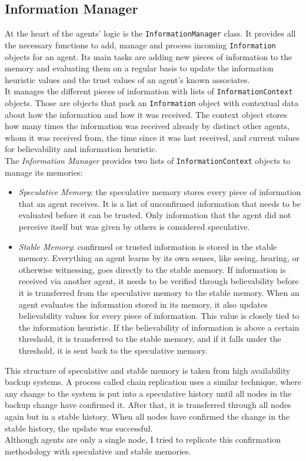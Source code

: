 \subsection{Information Manager}
At the heart of the agents' logic is the \verb|InformationManager| class. It provides all the necessary functions to add, manage and process incoming \verb|Information| objects for an agent. Its main tasks are adding new pieces of information to the memory and evaluating them on a regular basis to update the information heuristic values and the trust values of an agent's known associates.\\
It manages the different pieces of information with lists of \verb|InformationContext| objects. Those are objects that pack an \verb|Information| object with contextual data about how the information and how it was received. The context object stores how many times the information was received already by distinct other agents, whom it was received from, the time since it was last received, and current values for believability and information heuristic.\\
The \textit{Information Manager} provides two lists of \verb|InformationContext| objects to manage its memories:
\begin{itemize}
	\item \textit{Speculative Memory}: the speculative memory stores every piece of information that an agent receives. It is a list of unconfirmed information that needs to be evaluated before it can be trusted. Only information that the agent did not perceive itself but was given by others is considered speculative.
	\item \textit{Stable Memory}: confirmed or trusted information is stored in the stable memory. Everything an agent learns by its own senses, like seeing, hearing, or otherwise witnessing, goes directly to the stable memory. If information is received via another agent, it needs to be verified through believability before it is transferred from the speculative memory to the stable memory. When an agent evaluates the information stored in its memory, it also updates believability values for every piece of information. This value is closely tied to the information heuristic. If the believability of information is above a certain threshold, it is transferred to the stable memory, and if it falls under the threshold, it is sent back to the speculative memory.
\end{itemize}
This structure of speculative and stable memory is taken from high availability backup systems. A process called chain replication uses a similar technique, where any change to the system is put into a speculative history until all nodes in the backup change have confirmed it. After that, it is transferred through all nodes again but in a stable history. When all nodes have confirmed the change in the stable history, the update was successful.~\cite{Van2004}\\
Although agents are only a single node, I tried to replicate this confirmation methodology with speculative and stable memories.
